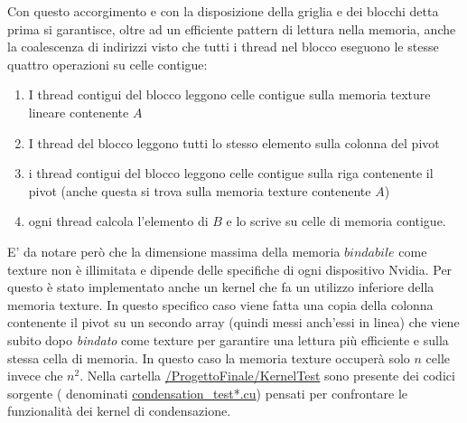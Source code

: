\documentclass{article}
\begin{document}
Con questo accorgimento e con la disposizione della griglia e dei blocchi detta prima si garantisce, oltre ad un efficiente pattern di lettura nella memoria, anche la coalescenza di indirizzi visto che tutti i thread nel blocco eseguono le stesse quattro operazioni su celle contigue:
\begin{enumerate}
\item I thread contigui del blocco leggono celle contigue sulla memoria texture lineare contenente $A$
\item I thread del blocco leggono tutti lo stesso elemento sulla colonna del pivot
\item i thread contigui del blocco leggono celle contigue sulla riga contenente il pivot (anche questa si trova sulla memoria texture contenente $A$)
\item ogni thread calcola l'elemento di $B$ e lo scrive su celle di memoria contigue.
\end{enumerate}

E' da notare però che la dimensione massima della memoria $bindabile$ come texture non è illimitata e dipende delle specifiche di ogni dispositivo Nvidia.
\newline
Per questo è stato implementato anche un kernel che fa un utilizzo inferiore della memoria texture. In questo specifico caso viene fatta una copia della colonna contenente il pivot su un secondo array (quindi messi anch'essi in linea) che viene subito dopo \emph{bindato} come texture per garantire una lettura più efficiente e sulla stessa cella di memoria. In questo caso la memoria texture occuperà solo $n$ celle invece che $n^{2}$.
\newline
Nella cartella \url{/ProgettoFinale/KernelTest} sono presente dei codici sorgente ( denominati \url{condensation_test*.cu}) pensati per confrontare le funzionalità dei kernel di condensazione.
\end{document}
